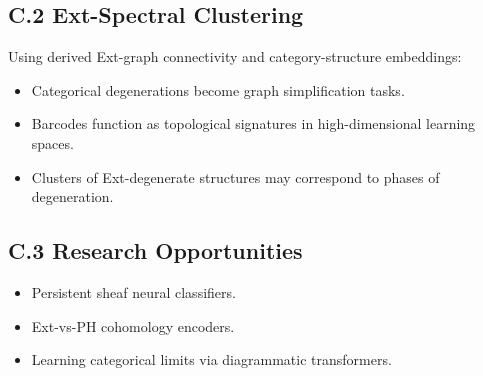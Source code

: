 \documentclass[11pt]{article}
\begin{document}
\subsection*{C.2 Ext-Spectral Clustering}

Using derived Ext-graph connectivity and category-structure embeddings:
\begin{itemize}
    \item Categorical degenerations become graph simplification tasks.
    \item Barcodes function as topological signatures in high-dimensional learning spaces.
    \item Clusters of Ext-degenerate structures may correspond to phases of degeneration.
\end{itemize}

\subsection*{C.3 Research Opportunities}

\begin{itemize}
    \item Persistent sheaf neural classifiers.
    \item Ext-vs-PH cohomology encoders.
    \item Learning categorical limits via diagrammatic transformers.
\end{itemize}
\end{document}
